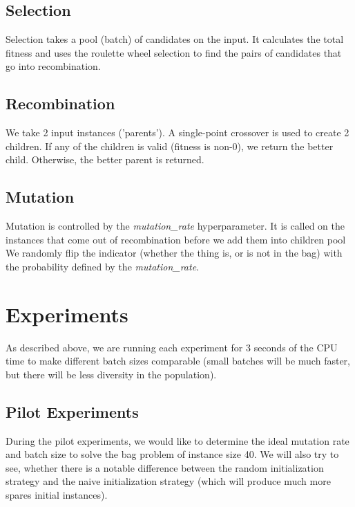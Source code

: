 \documentclass[a4paper,10pt]{article}
\begin{document}
\subsection{Selection}

Selection takes a pool (batch) of candidates on the input. It calculates the total fitness and uses the roulette wheel selection to find the pairs of candidates that go into recombination.

\subsection{Recombination}

We take 2 input instances ('parents'). A single-point crossover is used to create 2 children. If any of the children is valid (fitness is non-0), we return the better child. Otherwise, the better parent is returned.

\subsection{Mutation}

Mutation is controlled by the \emph{mutation\_rate} hyperparameter. It is called on the instances that come out of recombination before we add them into children pool We randomly flip the indicator (whether the thing is, or is not in the bag) with the probability defined by the \emph{mutation\_rate}.


\section{Experiments}

As described above, we are running each experiment for 3 seconds of the CPU time to make different batch sizes comparable (small batches will be much faster, but there will be less diversity in the population).

\subsection{Pilot Experiments}

During the pilot experiments, we would like to determine the ideal mutation rate and batch size to solve the bag problem of instance size 40. We will also try to see, whether there is a notable difference between the random initialization strategy and the naive initialization strategy (which will produce much more spares initial instances).
\end{document}
